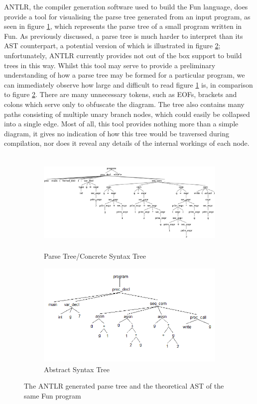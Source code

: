 \documentclass{l4proj}
\begin{document}
ANTLR, the compiler generation software used to build the Fun language, does provide a tool for visualising the parse tree generated from an input program, as seen in figure \ref{fig:ANTLR-parse-tree}, which represents  the parse tree of a small program written in Fun. As previously discussed, a parse tree is much harder to interpret than its AST counterpart, a potential version of which is illustrated in figure \ref{fig:ANTLR-syntax-tree}; unfortunately, ANTLR currently provides not out of the box support to build trees in this way. Whilst this tool may serve to provide a preliminary understanding of how a parse tree may be formed for a particular program, we can immediately observe how large and difficult to read figure \ref{fig:ANTLR-parse-tree} is, in comparison to figure \ref{fig:ANTLR-syntax-tree}. There are many unnecessary tokens, such as EOFs, brackets and colons which serve only to obfuscate the diagram. The tree also contains many paths consisting of multiple unary branch nodes, which could easily be collapsed into a single edge. Most of all, this tool provides nothing more than a simple diagram, it gives no indication of how this tree would be traversed during compilation, nor does it reveal any details of the internal workings of each node.
\begin{figure}[h]
	\begin{subfigure}[b]{0.5\textwidth}
		\includegraphics[height=5cm,width=\linewidth]{images/2-2a.png}
		\caption{Parse Tree/Concrete Syntax Tree}
		\label{fig:ANTLR-parse-tree}
	\end{subfigure}
	\begin{subfigure}[b]{0.5\textwidth}
		\includegraphics[height=5cm,width=\linewidth]{images/2-2b.png}
		\caption{Abstract Syntax Tree}
		\label{fig:ANTLR-syntax-tree}
	\end{subfigure}
	\caption{The ANTLR generated parse tree and the theoretical AST of the same Fun program}\label{fig:parse-abstract-tree}	
\end{figure}
\end{document}
